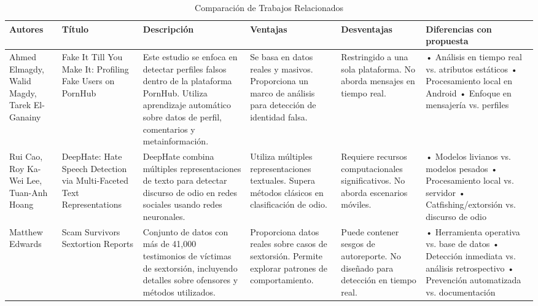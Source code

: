 \documentclass{article}
\begin{document}
\begin{table}[H]
    \centering
    \caption{Comparación de Trabajos Relacionados}
    \begin{tabularx}{\textwidth}{|X|X|X|X|X|X|}
    \hline 
    \textbf{Autores} & \textbf{Título} & \textbf{Descripción} & \textbf{Ventajas} & \textbf{Desventajas} & \textbf{Diferencias con propuesta} \\
    \hline\hline
    
    Ahmed Elmagdy, Walid Magdy, Tarek El-Ganainy & Fake It Till You Make It: Profiling Fake Users on PornHub
    \cite{magdy2017faketillmakeit}
    & Este estudio se enfoca en detectar perfiles falsos dentro de la plataforma PornHub. Utiliza aprendizaje automático sobre datos de perfil, comentarios y metainformación. & Se basa en datos reales y masivos. Proporciona un marco de análisis para detección de identidad falsa. & Restringido a una sola plataforma. No aborda mensajes en tiempo real. & • Análisis en tiempo real vs. atributos estáticos \newline • Procesamiento local en Android \newline • Enfoque en mensajería vs. perfiles \\
    \hline
    
    Rui Cao, Roy Ka-Wei Lee, Tuan-Anh Hoang & DeepHate: Hate Speech Detection via Multi-Faceted Text Representations & DeepHate combina múltiples representaciones de texto para detectar discurso de odio en redes sociales usando redes neuronales. & Utiliza múltiples representaciones textuales. Supera métodos clásicos en clasificación de odio. & Requiere recursos computacionales significativos. No aborda escenarios móviles. & • Modelos livianos vs. modelos pesados \newline • Procesamiento local vs. servidor \newline • Catfishing/extorsión vs. discurso de odio \\
    \hline
    
    Matthew Edwards & Scam Survivors Sextortion Reports & Conjunto de datos con más de 41,000 testimonios de víctimas de sextorsión, incluyendo detalles sobre ofensores y métodos utilizados. & Proporciona datos reales sobre casos de sextorsión. Permite explorar patrones de comportamiento. & Puede contener sesgos de autoreporte. No diseñado para detección en tiempo real. & • Herramienta operativa vs. base de datos \newline • Detección inmediata vs. análisis retrospectivo \newline • Prevención automatizada vs. documentación \\
    \hline
    
    \end{tabularx}
\end{table}
\end{document}
